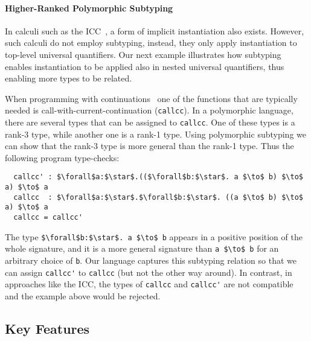 \paragraph{Higher-Ranked Polymorphic Subtyping}
\label{sec:higher-ranked-poly}

In calculi such as the ICC~\citep{miquel2001implicit}, a form of implicit instantiation also exists.
However, such calculi do not employ subtyping, instead, they only apply instantiation
to top-level universal quantifiers. Our next example illustrates how subtyping enables
instantiation to be applied also in nested universal quantifiers, thus enabling
more types to be related.

When programming with continuations~\citep{sussman1998scheme} one of the
functions that are typically needed is call-with-current-continuation
(\verb|callcc|). In a polymorphic language, there are several types that can be
assigned to \verb|callcc|. One of these types is a rank-3 type,
while another one is a rank-1 type.
Using polymorphic subtyping we can show that the rank-3
type is more general than the rank-1 type. Thus the following program type-checks:
\begin{lstlisting}
  callcc' : $\forall$a:$\star$.(($\forall$b:$\star$. a $\to$ b) $\to$ a) $\to$ a
  callcc  : $\forall$a:$\star$.$\forall$b:$\star$. ((a $\to$ b) $\to$ a) $\to$ a
  callcc = callcc'
\end{lstlisting}
\noindent The type \lstinline{$\forall$b:$\star$. a $\to$ b} appears in a positive position
of the whole signature, and it is a more general signature than \lstinline{a $\to$ b}
for an arbitrary choice of \lstinline{b}. Our language captures this subtyping relation so that
we can assign \lstinline{callcc'} to \lstinline{callcc} (but not the other way around).
In contrast, in approaches like the ICC, the types of \lstinline{callcc} and \lstinline{callcc'}
are not compatible and the example above would be rejected.

\subsection{Key Features}
\label{sec:feature-overview}

